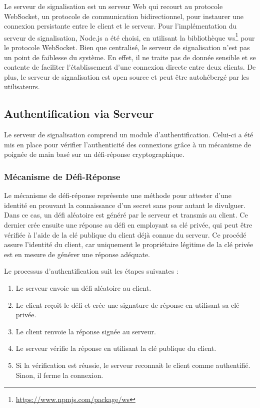 Le serveur de signalisation est un serveur Web qui recourt au protocole \gls{WebSocket}, un protocole de communication bidirectionnel, pour instaurer une connexion persistante entre le client et le serveur. Pour l'implémentation du serveur de signalisation, \gls{Node.js} a été choisi, en utilisant la bibliothèque ws\footnote{\url{https://www.npmjs.com/package/ws}} pour le protocole \gls{WebSocket}. Bien que centralisé, le serveur de signalisation n'est pas un point de faiblesse du système. En effet, il ne traite pas de donnée sensible et se contente de faciliter l'établissement d'une connexion directe entre deux clients. De plus, le serveur de signalisation est open source et peut être autohébergé par les utilisateurs.

\subsection{Authentification via Serveur}

Le serveur de signalisation comprend un module d'authentification. Celui-ci a été mis en place pour vérifier l'authenticité des connexions grâce à un mécanisme de poignée de main basé sur un défi-réponse cryptographique.

\subsubsection{Mécanisme de Défi-Réponse}

Le mécanisme de défi-réponse représente une méthode pour attester d'une identité en prouvant la connaissance d'un secret sans pour autant le divulguer. Dans ce cas, un défi aléatoire est généré par le serveur et transmis au client. Ce dernier crée ensuite une réponse au défi en employant sa clé privée, qui peut être vérifiée à l'aide de la clé publique du client déjà connue du serveur. Ce procédé assure l'identité du client, car uniquement le propriétaire légitime de la clé privée est en mesure de générer une réponse adéquate.

Le processus d'authentification suit les étapes suivantes :

\begin{enumerate}
    \item Le serveur envoie un défi aléatoire au client.
    \item Le client reçoit le défi et crée une signature de réponse en utilisant sa clé privée.
    \item Le client renvoie la réponse signée au serveur.
    \item Le serveur vérifie la réponse en utilisant la clé publique du client.
    \item Si la vérification est réussie, le serveur reconnait le client comme authentifié. Sinon, il ferme la connexion.
\end{enumerate}

